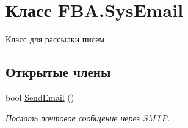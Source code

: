\hypertarget{class_f_b_a_1_1_sys_email}{}\section{Класс F\+B\+A.\+Sys\+Email}
\label{class_f_b_a_1_1_sys_email}


Класс для рассылки писем  


\subsection*{Открытые члены}
\begin{DoxyCompactItemize}
\item 
bool \mbox{\hyperlink{class_f_b_a_1_1_sys_email_ad587f740e698d8c199cec34655e69a96}{Send\+Email}} ()
\begin{DoxyCompactList}\small\item\em Послать почтовое сообщение через S\+M\+TP. \end{DoxyCompactList}\end{DoxyCompactItemize}
